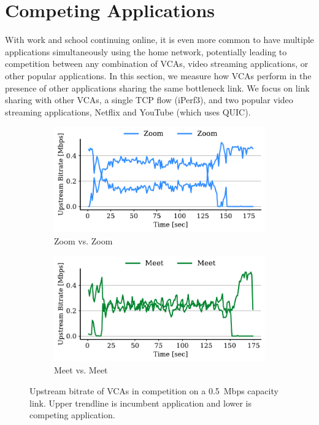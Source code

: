 \section{Competing Applications}
\label{sec:competition}

With work and school continuing online, it is even more common to have multiple
applications simultaneously using the home network, potentially leading to
competition between any combination of VCAs, video streaming applications, or other popular
applications. In this section, we measure how VCAs perform in the presence of
other applications sharing the same bottleneck link. We focus on
link sharing with other VCAs, a single TCP flow (iPerf3), and two popular
video streaming applications, Netflix and YouTube (which uses QUIC).


\begin{figure}[t!]
\centering
\begin{subfigure}[t]{.4\textwidth}
    \centering
    \includegraphics[width=1\textwidth]{figures/comp_ts/zoom_zoom_0.5_ul_r2.pdf}
    \caption{Zoom vs. Zoom}
    \label{subfig:zoom_zoom_0_5}
\end{subfigure}\hfill
\begin{subfigure}[t]{.4\textwidth}
    \centering
    \includegraphics[width=1\textwidth]{figures/comp/meet_meet_0.5_ul_r1.pdf}
    \caption{Meet vs. Meet}
    \label{subfig:meet_meet_0_5}
\end{subfigure}
\caption{Upstream bitrate of VCAs in competition on a 0.5~Mbps capacity link. Upper trendline is incumbent application and lower is competing application.}
\label{fig:meet-zoom-upld-0.5}
\end{figure}

